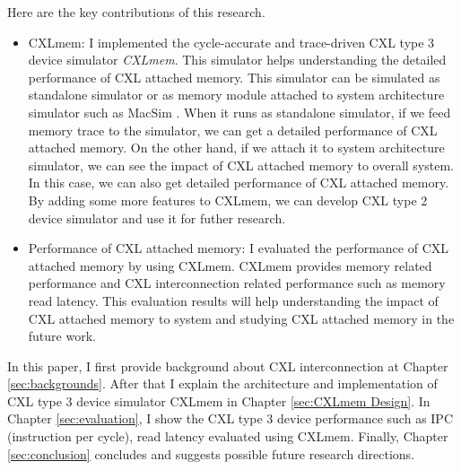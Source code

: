 Here are the key contributions of this research.
\begin{itemize}
    \item CXLmem: I implemented the cycle-accurate and trace-driven CXL type 3 device simulator \textit{CXLmem}. This simulator helps understanding the detailed performance of CXL attached memory. This simulator can be simulated as standalone simulator or as memory module attached to system architecture simulator such as MacSim \cite{MACSIM}. When it runs as standalone simulator, if we feed memory trace to the simulator, we can get a detailed performance of CXL attached memory. On the other hand, if we attach it to system architecture simulator, we can see the impact of CXL attached memory to overall system. In this case, we can also get detailed performance of CXL attached memory. By adding some more features to CXLmem, we can develop CXL type 2 device simulator and use it for futher research.
    \item Performance of CXL attached memory: I evaluated the performance of CXL attached memory by using CXLmem. CXLmem provides memory related performance and CXL interconnection related performance such as memory read latency. This evaluation results will help understanding the impact of CXL attached memory to system and studying CXL attached memory in the future work.
\end{itemize}

In this paper, I first provide background about CXL interconnection at Chapter \ref{sec:backgrounds}. After that I explain the architecture and implementation of CXL type 3 device simulator CXLmem in Chapter \ref{sec:CXLmem Design}. In Chapter \ref{sec:evaluation}, I show the CXL type 3 device performance such as IPC (instruction per cycle), read latency evaluated using CXLmem. Finally, Chapter \ref{sec:conclusion} concludes and suggests possible future research directions.